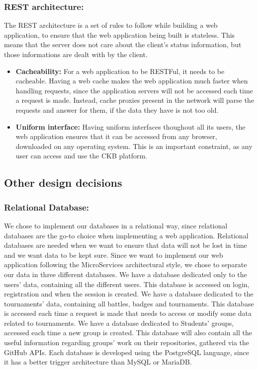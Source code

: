\documentclass{article}
\begin{document}
{    \subsubsection{REST architecture:}
    The REST architecture is a set of rules to follow while building a web application, to ensure that the web application being built is stateless.
    This means that the server does not care about the client's status information, but those informations are dealt with by the client.
    \begin{itemize}
    \item \textbf{Cacheability:} For a web application to be RESTFul, it needs to be cacheable. Having a web cache makes the web application much faster when handling 
    requests, since the application servers will not be accessed each time a request is made. Instead, cache proxies present in the network will parse the requests and
    answer for them, if the data they have is not too old.
    \item \textbf{Uniform interface:} Having uniform interfaces thoughout all its users, the web application ensures that it can be accessed from any browser, downloaded
    on any operating system. This is an important constraint, as any user can access and use the CKB platform.
    \end{itemize}
\subsection{Other design decisions}
    \subsubsection{Relational Database:} We chose to implement our databases in a relational way, since relational databases are the go-to choice when 
    implementing a web application. Relational databases are needed when we want to ensure that data will not be lost in time and we want data to be kept sure.
    Since we want to implement our web application following the MicroServices architectural style, we chose to separate our data in three different databases.
    We have a database dedicated only to the users' data, containing all the different users. This database is accessed on login, registration and when the 
    session is created.
    We have a database dedicated to the tournaments' data, containing all battles, badges and tournaments. This database is accessed each time a request 
    is made that needs to access or modify some data related to tournaments.
    We have a database dedicated to Students' groups, accessed each time a new group is created. This database will also contain all the
    useful information regarding groups' work on their repositories, gathered via the GitHub APIs.
    Each database is developed using the PostgreSQL language, since it has a better trigger architecture than MySQL or MariaDB.

}
\end{document}
